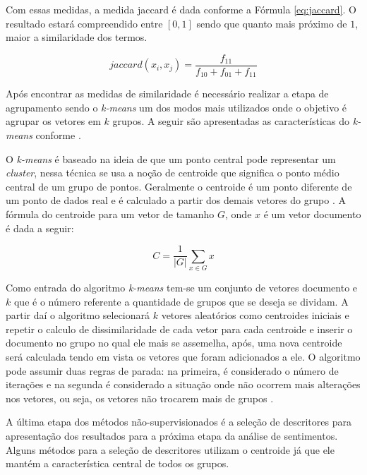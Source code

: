 Com essas medidas, a medida jaccard é dada conforme a Fórmula \ref{eq:jaccard}. O resultado estará compreendido entre $\left [ 0,1 \right ]$ sendo que quanto mais próximo de $1$, maior a similaridade dos termos.

\begin{equation}
    \label{eq:jaccard}
     jaccard(x_{i},x_{j}) = \frac{f_{11} }{f_{10} +f_{01}  + f_{11} }
\end{equation}

Após encontrar as medidas de similaridade é necessário  realizar a etapa de agrupamento sendo o \textit{k-means} um dos modos mais utilizados onde o objetivo é agrupar os vetores em $k$ grupos. A seguir são apresentadas as características do \textit{k-means} conforme  .

O \textit{k-means} é baseado na ideia de que um ponto central pode representar um \textit{cluster}, nessa técnica se usa a noção de centroide que significa o ponto médio central de um grupo de pontos. Geralmente o centroide é um ponto diferente de um ponto de dados real e é calculado a partir dos demais vetores do grupo \cite{Steinbach00acomparison}. A fórmula do centroide para um vetor de tamanho $G$, onde $x$ é um vetor documento é dada a seguir:

\begin{equation}
    \label{eq:centroide}
     C=\frac{1}{|G|}\sum_{x \in G}x
\end{equation}

Como entrada do algoritmo \textit{k-means} tem-se um conjunto de vetores documento e $k$ que é o número referente a quantidade de grupos que se deseja se dividam. A partir daí o algoritmo selecionará $k$ vetores aleatórios como centroides iniciais e repetir o calculo de dissimilaridade de cada vetor para cada centroide e inserir o documento no grupo no qual ele mais se assemelha, após, uma nova centroide será calculada tendo em vista os vetores que foram adicionados a ele. O algoritmo pode assumir duas regras de parada: na primeira, é considerado o número de iterações e na segunda é considerado a situação onde não ocorrem mais alterações nos vetores, ou seja, os vetores não trocarem mais de grupos \cite{Steinbach00acomparison}.

A última etapa dos métodos não-supervisionados é a seleção de descritores para apresentação dos resultados para a próxima etapa da análise de sentimentos. Alguns métodos para a seleção de descritores utilizam o centroide já que ele mantém a característica central de todos os grupos.

